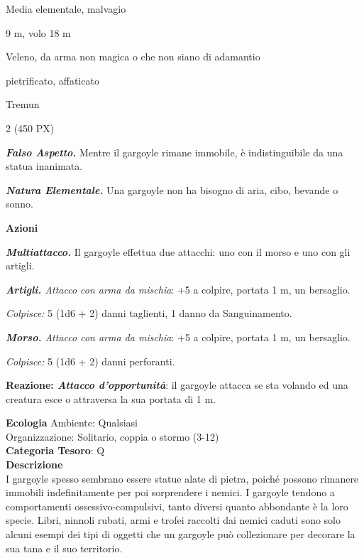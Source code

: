 \begin{multicols}{2}
{
\begin{description}[noitemsep, topsep=0pt, parsep=0pt, partopsep=0pt, itemsep=1pt, leftmargin=2.35cm,  labelwidth=2.2cm, itemindent=0cm, listparindent=0pt] %
\setlength{\baselineskip}{10pt}
\item[\textbf{Taglia/Tipo}] Media elementale, malvagio
\item[\textbf{Caratt.}] 
\item[\textbf{Punti Ferita}] 
\item[\textbf{Movimento}] 9 m, volo 18 m
\item[\textbf{Tiri Salvez.}] 
\item[\textbf{Res. Danni}] Veleno, da arma non magica o che non siano di adamantio
\item[\textbf{Immunità}] pietrificato, affaticato
\item[\textbf{Sensi}] 
\item[\textbf{Linguaggi}] Tremun
\item[\textbf{Sfida}] 2 (450 PX)
\end{description}
\smallskip

\emph{\textbf{Falso Aspetto.}} Mentre il gargoyle rimane immobile, è indistinguibile da una statua inanimata.

\emph{\textbf{Natura Elementale.}} Una gargoyle non ha bisogno di aria, cibo, bevande o sonno.

\textbf{Azioni}

\emph{\textbf{Multiattacco.}} Il gargoyle effettua due attacchi: uno con il morso e uno con gli artigli.

\emph{\textbf{Artigli.} Attacco con arma da mischia}: +5 a colpire, portata 1 m, un bersaglio.

\emph{Colpisce:} 5 (1d6 + 2) danni taglienti, 1 danno da Sanguinamento.

\emph{\textbf{Morso.} Attacco con arma da mischia}: +5 a colpire, portata 1 m, un bersaglio.

\emph{Colpisce:} 5 (1d6 + 2) danni perforanti.

\textbf{Reazione: \emph{Attacco d'opportunità}}: il gargoyle attacca se sta volando ed una creatura esce o attraversa la sua portata di 1 m.

\textbf{Ecologia}
Ambiente: Qualsiasi\\
Organizzazione: Solitario, coppia o stormo (3-12)\\
\textbf{Categoria Tesoro}: Q\\
\textbf{Descrizione}\\
I gargoyle spesso sembrano essere statue alate di pietra, poiché possono rimanere immobili indefinitamente per poi sorprendere i nemici. I gargoyle tendono a comportamenti ossessivo-compulsivi, tanto diversi quanto abbondante è la loro specie. Libri, ninnoli rubati, armi e trofei raccolti dai nemici caduti sono solo alcuni esempi dei tipi di oggetti che un gargoyle può collezionare per decorare la sua tana e il suo territorio.

}
\end{multicols}
